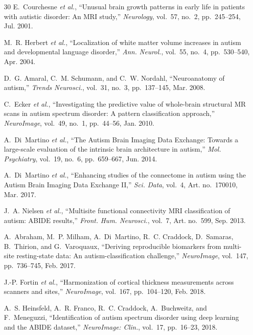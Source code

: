 \documentclass[conference]{IEEEtran}
\begin{document}
\begin{thebibliography}{30}
E.~Courchesne \emph{et al.}, ``Unusual brain growth patterns in early life in patients with autistic disorder: An MRI study,'' \emph{Neurology}, vol.~57, no.~2, pp.~245--254, Jul. 2001.

M.~R. Herbert \emph{et al.}, ``Localization of white matter volume increases in autism and developmental language disorder,'' \emph{Ann. Neurol.}, vol.~55, no.~4, pp.~530--540, Apr. 2004.

D.~G. Amaral, C.~M. Schumann, and C.~W. Nordahl, ``Neuroanatomy of autism,'' \emph{Trends Neurosci.}, vol.~31, no.~3, pp.~137--145, Mar. 2008.

C.~Ecker \emph{et al.}, ``Investigating the predictive value of whole-brain structural MR scans in autism spectrum disorder: A pattern classification approach,'' \emph{NeuroImage}, vol.~49, no.~1, pp.~44--56, Jan. 2010.

A.~Di~Martino \emph{et al.}, ``The Autism Brain Imaging Data Exchange: Towards a large-scale evaluation of the intrinsic brain architecture in autism,'' \emph{Mol. Psychiatry}, vol.~19, no.~6, pp.~659--667, Jun. 2014.

A.~Di~Martino \emph{et al.}, ``Enhancing studies of the connectome in autism using the Autism Brain Imaging Data Exchange II,'' \emph{Sci. Data}, vol.~4, Art. no.~170010, Mar. 2017.

J.~A. Nielsen \emph{et al.}, ``Multisite functional connectivity MRI classification of autism: ABIDE results,'' \emph{Front. Hum. Neurosci.}, vol.~7, Art. no.~599, Sep. 2013.

A.~Abraham, M.~P. Milham, A.~Di~Martino, R.~C. Craddock, D.~Samaras, B.~Thirion, and G.~Varoquaux, ``Deriving reproducible biomarkers from multi-site resting-state data: An autism-classification challenge,'' \emph{NeuroImage}, vol.~147, pp.~736--745, Feb. 2017.

J.-P. Fortin \emph{et al.}, ``Harmonization of cortical thickness measurements across scanners and sites,'' \emph{NeuroImage}, vol.~167, pp.~104--120, Feb. 2018.

A.~S. Heinsfeld, A.~R. Franco, R.~C. Craddock, A.~Buchweitz, and F.~Meneguzzi, ``Identification of autism spectrum disorder using deep learning and the ABIDE dataset,'' \emph{NeuroImage: Clin.}, vol.~17, pp.~16--23, 2018.


\end{thebibliography}
\end{document}
